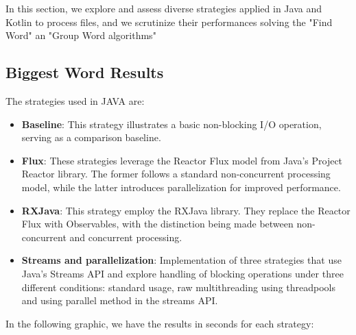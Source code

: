 In this section, we explore and assess diverse strategies applied in Java and Kotlin to process files, and we scrutinize their performances solving the "Find Word" an "Group Word algorithms"


\subsection{Biggest Word Results}
\label{subsubsec:biggest_word_results}

The strategies used in JAVA are:

\begin{itemize}
    \item \textbf{Baseline}: This strategy illustrates a basic non-blocking I/O operation, serving as a comparison baseline.
    \item \textbf{Flux}: These strategies leverage the Reactor Flux model from Java's Project Reactor library. The former follows a standard non-concurrent processing model, while the latter introduces parallelization for improved performance.
    \item \textbf{RXJava}: This strategy employ the RXJava library. They replace the Reactor Flux with Observables, with the distinction being made between non-concurrent and concurrent processing.
    \item \textbf{Streams and parallelization}: Implementation of three strategies that use Java's Streams API and explore handling of blocking operations under three different conditions: standard usage, raw multithreading using threadpools and using parallel method in the streams API.
    
\end{itemize}


In the following graphic, we have the results in seconds for each strategy:

